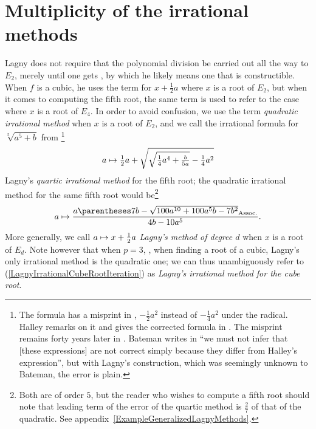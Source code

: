 ﻿\documentclass[10pt, a4paper, twoside]{basestyle}
\begin{document}
\section*{Multiplicity of the irrational methods}
Lagny does not require that the polynomial division be carried out
all the way to $E_2$, merely until one gets , by which he likely means
one that is constructible. When $f$ is a cubic, he uses the term  for $x+\frac{1}{2}a$ where
$x$ is a root of $E_2$, but when it comes to computing the fifth root, the same term is used to refer to the case where $x$ is a root of
$E_4$. In order to avoid confusion, we use the term \emph{quadratic irrational method} when $x$ is a root of $E_2$,
and we call the irrational formula for $\sqrt[5]{a^5+b}$ from \cite[43]{FantetdeLagny1692}\footnote{The formula has a misprint in
\cite[43]{FantetdeLagny1692}, $-\tfrac{1}{2}a^2$ instead of $-\tfrac{1}{4}a^2$ under the radical.
Halley remarks on it and gives the corrected formula in \cite[137,140]{Halley1694}.
The misprint remains forty years later in \cite[\pno~440 misnumbered 340]{FantetdeLagny1733}.
Bateman writes in \cite{Bateman1938} ``we must not infer that [these expressions] are not correct simply because
they differ from Halley's expression'', but with Lagny's construction, which was seemingly unknown to Bateman, the
error is plain.}\[
\FunctionBody{a}{\tfrac{1}{2}a+\sqrt{\sqrt{\tfrac{1}{4}a^4+\tfrac{b}{5a}}-\tfrac{1}{4}a^2}}
\]
Lagny's \emph{quartic irrational method} for the fifth root;
the quadratic irrational method for the same fifth root would be\footnote{Both are of order $5$, but the reader who wishes
to compute a fifth root should note that leading term of the error of the quartic method is
$\frac{2}{7}$ of that of the quadratic. See appendix~\ref{ExampleGeneralizedLagnyMethods}.}\[
\FunctionBody{a}{\frac{a\pa{7b-\sqrt{100a^{10}+100a^{5}b-7b^2}}}{4b-10a^5}}\text.
\]
More generally, we call $\FunctionBody{a}{x+\frac{1}{2}a}$ \emph{Lagny's method of degree $d$} when
$x$ is a root of $E_{d}$.
Note however that when $p=3$, \idest, when finding a root of a cubic, Lagny's only irrational method
is the quadratic one; we can thus unambiguously refer to (\ref{LagnyIrrationalCubeRootIteration}) as \emph{Lagny's irrational method for the cube root}.
\end{document}
